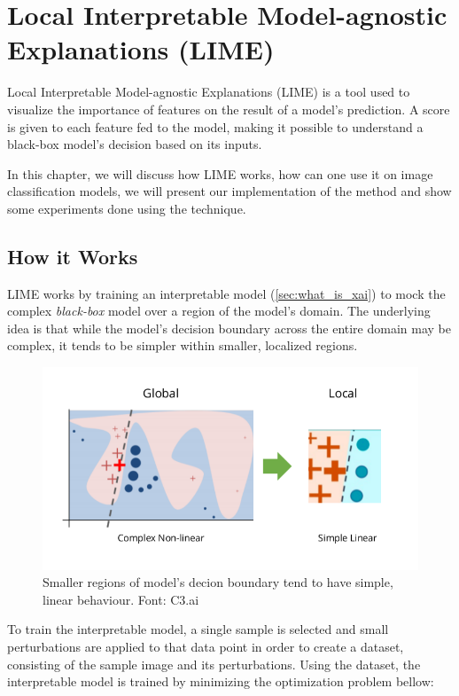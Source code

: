 \chapter{Local Interpretable Model-agnostic Explanations (LIME)}

Local Interpretable Model-agnostic Explanations (LIME) \citep{ribeiro2016whyitrustyou}  is a tool used to visualize the importance of features on the result of a model's prediction.
A score is given to each feature fed to the model, making it possible to understand a black-box model's decision based on its inputs. 

In this chapter, we will discuss how LIME works, how can one use it on image classification models, we will present our implementation of the method and show some experiments done using the technique. 

\section{How it Works}

LIME works by training an interpretable model (\ref{sec:what_is_xai}) to mock the complex \emph{black-box} model over a region of the model's domain.
The underlying idea is that while the model's decision boundary across the entire domain may be complex, it tends to be simpler within smaller, localized regions.

\begin{figure} 
    \centering
    \includegraphics[width=0.5\linewidth]{figuras/lime/lime_regions.png}
    \caption{Smaller regions of model's decion boundary tend to have simple, linear behaviour. Font: C3.ai\footnotemark}
\end{figure}

To train the interpretable model, a single sample is selected and small perturbations are applied to that data point in order to create a dataset, consisting of the sample image and its perturbations.
Using the dataset, the interpretable model is trained by minimizing the optimization problem bellow:

